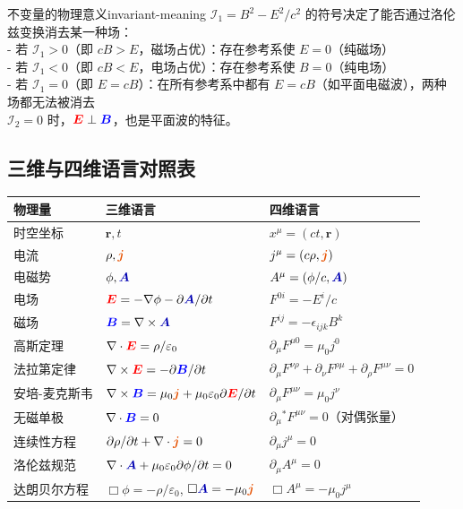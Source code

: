 \documentclass[11pt,a4paper,openany,oneside]{book}
\newcommand{\vecE}{\textcolor{red}{\vect{E}}}
\newcommand{\vecB}{\textcolor{blue}{\vect{B}}}
\newcommand{\vecJ}{\textcolor{cororange}{\vect{j}}}
\newcommand{\vecA}{\textcolor{blue!70!black}{\vect{A}}}
\newcommand{\eps}{\varepsilon}
\newcommand{\vect}[1]{\bm{#1}}
\newcommand{\grad}{\nabla}
\newcommand{\curl}{\nabla\times}
\newcommand{\divg}{\nabla\cdot}
\begin{document}
\begin{insight}{不变量的物理意义}{invariant-meaning}
$\mathcal{I}_1 = B^2 - E^2/c^2$ 的符号决定了能否通过洛伦兹变换消去某一种场：\\
- 若 $\mathcal{I}_1 > 0$（即 $cB > E$，磁场占优）：存在参考系使 $E=0$（纯磁场）\\
- 若 $\mathcal{I}_1 < 0$（即 $cB < E$，电场占优）：存在参考系使 $B=0$（纯电场）\\
- 若 $\mathcal{I}_1 = 0$（即 $E=cB$）：在所有参考系中都有 $E=cB$（如平面电磁波），两种场都无法被消去\\
$\mathcal{I}_2 = 0$ 时，$\vecE\perp\vecB$，也是平面波的特征。
\end{insight}

\subsection{三维与四维语言对照表}

\begin{center}
\begin{tabular}{lll}
\toprule
\textbf{物理量} & \textbf{三维语言} & \textbf{四维语言} \\
\midrule
时空坐标 & $\vect{r}, t$ & $x^\mu = (ct, \vect{r})$ \\
电流 & $\rho, \vecJ$ & $j^\mu = (c\rho, \vecJ)$ \\
电磁势 & $\phi, \vecA$ & $A^\mu = (\phi/c, \vecA)$ \\
电场 & $\vecE = -\grad\phi - \partial\vecA/\partial t$ & $F^{0i} = -E^i/c$ \\
磁场 & $\vecB = \curl\vecA$ & $F^{ij} = -\epsilon_{ijk}B^k$ \\
高斯定理 & $\divg\vecE = \rho/\eps_0$ & $\partial_\mu F^{\mu 0} = \mu_0 j^0$ \\
法拉第定律 & $\curl\vecE = -\partial\vecB/\partial t$ & $\partial_\mu F^{\nu\rho} + \partial_\nu F^{\rho\mu} + \partial_\rho F^{\mu\nu} = 0$ \\
安培-麦克斯韦 & $\curl\vecB = \mu_0\vecJ + \mu_0\eps_0\partial\vecE/\partial t$ & $\partial_\mu F^{\mu\nu} = \mu_0 j^\nu$ \\
无磁单极 & $\divg\vecB = 0$ & $\partial_\mu {}^*\!F^{\mu\nu} = 0$（对偶张量） \\
连续性方程 & $\partial\rho/\partial t + \divg\vecJ = 0$ & $\partial_\mu j^\mu = 0$ \\
洛伦兹规范 & $\nabla\cdot\vecA + \mu_0\eps_0\partial\phi/\partial t = 0$ & $\partial_\mu A^\mu = 0$ \\
达朗贝尔方程 & $\Box\phi = -\rho/\eps_0$, $\Box\vecA = -\mu_0\vecJ$ & $\Box A^\mu = -\mu_0 j^\mu$ \\
\bottomrule
\end{tabular}
\end{center}
\end{document}
